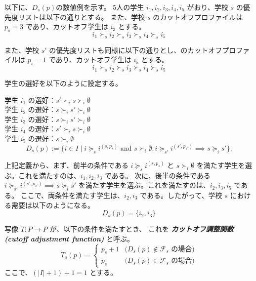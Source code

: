 \documentclass[12pt, a4paper]{article}
\theoremstyle{definition}
\theoremstyle{remark}
\theoremstyle{plain}
\begin{document}
以下に、$D_s(p)$の数値例を示す。
5人の学生 \( i_1, i_2, i_3, i_4, i_5 \) がおり、学校 \( s \) の優先度リストは以下の通りとする。 また、学校 \( s \) のカットオフプロファイルは \( p_s = 3 \) であり、カットオフ学生は \( i_3 \) とする。
  \[
  i_1 \succ_s i_2 \succ_s i_3 \succ_s i_4 \succ_s i_5
  \]

  また、学校 \( s' \) の優先度リストも同様に以下の通りとし、のカットオフプロファイルは \( p_s = 1 \) であり、カットオフ学生は \( i_5 \) とする。
  \[
  i_1 \succ_s i_2 \succ_s i_3 \succ_s i_4 \succ_s i_5
  \]

学生の選好を以下のように設定する。

学生 \( i_1 \) の選好：$s' \succ_i s \succ_i \emptyset$ \\
学生 \( i_2 \) の選好：$s \succ_i s' \succ_i \emptyset$ \\
学生 \( i_3 \) の選好：$s \succ_i s' \succ_i \emptyset$ \\
学生 \( i_4 \) の選好：$s' \succ_i s \succ_i \emptyset$ \\
学生 \( i_5 \) の選好：$s \succ_i \emptyset$ \\
\[
  D_s(p) := \{i \in I \mid i \succeq_s i^{(s,p_s)} \text{ and } s \succ_i \emptyset; i \succeq_{s'} i^{(s',p_{s'})} \implies s \succeq_i s' \}.
\]

上記定義から、まず、前半の条件である \( i \succeq_s i^{(s,p_s)} \) と \( s \succ_i \emptyset \) を満たす学生を選ぶ。これを満たすのは、\( i_1, i_2, i_3 \) である。
次に、後半の条件である \( i \succeq_{s'} i^{(s',p_{s'})} \implies s \succeq_i s' \) を満たす学生を選ぶ。これを満たすのは、\( i_2, i_3, i_5 \) である。
ここで、両条件を満たす学生は、\( i_2, i_3 \) である。したがって、学校 \( s \) における需要は以下のようになる。
\[
D_s(p) = \{i_2, i_3\}
\]




写像 $T: P \to P$ が、以下の条件を満たすとき、
これを \textbf{\textit{カットオフ調整関数 (cutoff adjustment function)}} と呼ぶ。
\[
    T_s(p) =
    \begin{cases}
        p_s + 1 & \text{($D_s(p) \notin \mathcal{F}_s$ の場合)} \\
        p_s     & \text{($D_s(p) \in \mathcal{F}_s$ の場合)}
    \end{cases}
\]
ここで、\( (|I| + 1) + 1 = 1 \) とする。
\end{document}
